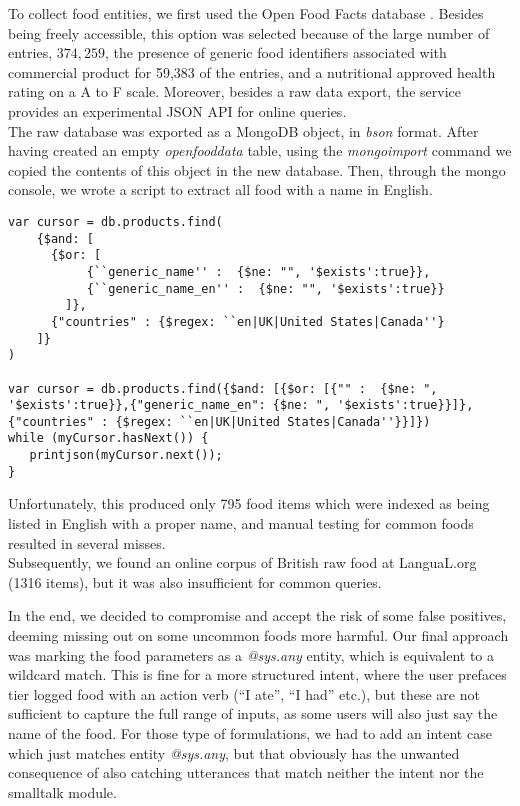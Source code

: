 To collect food entities, we first used the Open Food Facts database \cite{openfoodfacts}. Besides being freely accessible, this option was selected because of the large number of entries, $374,259$, the presence of generic food identifiers associated with commercial product for 59,383 of the entries, and a nutritional approved health rating on a A to F scale. Moreover, besides a raw data export, the service provides an experimental JSON API for online queries. \\
The raw database was exported as a MongoDB \cite{mongo} object, in \textit{bson} format. After having created an empty \textit{openfooddata} table, using the \textit{mongoimport} command we copied the contents of this object in the new database. Then, through the mongo console, we wrote a script to extract all food with a name in English.
\begin{lstlisting}
var cursor = db.products.find( 
    {$and: [
      {$or: [
           {``generic_name'' :  {$ne: "", '$exists':true}},
           {``generic_name_en'' :  {$ne: "", '$exists':true}}
        ]},
      {"countries" : {$regex: ``en|UK|United States|Canada''}
    ]}
)

var cursor = db.products.find({$and: [{$or: [{"" :  {$ne: ", '$exists':true}},{"generic_name_en": {$ne: ", '$exists':true}}]}, {"countries" : {$regex: ``en|UK|United States|Canada''}}]})
while (myCursor.hasNext()) {
   printjson(myCursor.next());
}
\end{lstlisting}

Unfortunately, this produced only 795 food items which were indexed as being listed in English with a proper name, and manual testing for common foods resulted in several misses.\\
Subsequently, we found an online corpus of British raw food at LanguaL.org \cite{langual} (1316 items), but it was also insufficient for common queries. 

In the end, we decided to compromise and accept the risk of some false positives, deeming missing out on some uncommon foods more harmful. Our final approach was marking the food parameters as a \textit{@sys.any} entity, which is equivalent to a wildcard match. This is fine for a more structured intent, where the user prefaces tier logged food with an action verb (``I ate'', ``I had'' etc.), but these are not sufficient to capture the full range of inputs, as some users will also just say the name of the food. For those type of formulations, we had to add an intent case which just matches entity \textit{@sys.any}, but that obviously has the unwanted consequence of also catching utterances that match neither the intent nor the smalltalk module.
